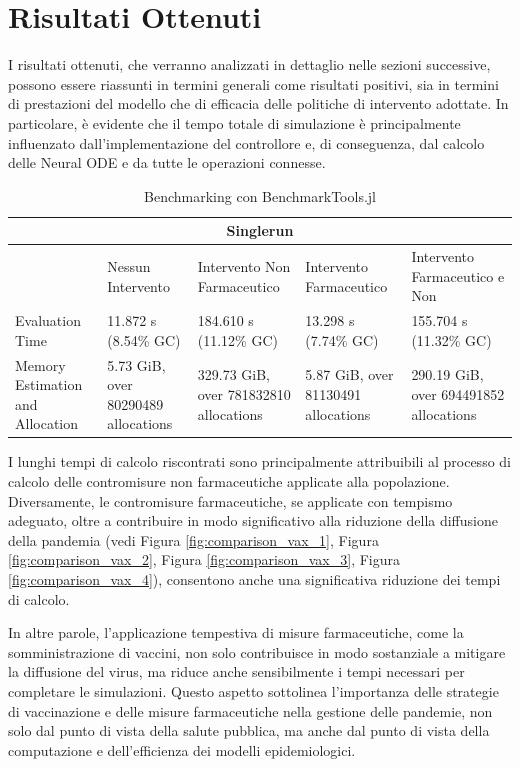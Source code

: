 \section{Risultati Ottenuti}

I risultati ottenuti, che verranno analizzati in dettaglio nelle 
sezioni successive, possono essere riassunti in termini generali come 
risultati positivi, sia in termini di prestazioni del modello che di 
efficacia delle politiche di intervento adottate. In particolare, 
è evidente che il tempo totale di simulazione è principalmente 
influenzato dall'implementazione del controllore e, di conseguenza, 
dal calcolo delle Neural ODE e da tutte le operazioni connesse.

\begin{table}[htb]
    \centering
    \caption{Benchmarking con BenchmarkTools.jl \cite{chen2016robust}}
    \begin{tabular}{|p{2.57cm}||p{2.57cm}|p{2.57cm}|p{2.57cm}|p{2.57cm}|}
        \hline
        \multicolumn{5}{|c|}{Singlerun} \\
        \hline
        & Nessun Intervento & Intervento Non Farmaceutico & Intervento Farmaceutico & Intervento Farmaceutico e Non \\
        \hline
        Evaluation Time & 11.872 s (8.54\% GC) & 184.610 s (11.12\% GC) & 13.298 s (7.74\% GC) & 155.704 s (11.32\% GC) \\
        Memory Estimation and Allocation & 5.73 GiB, over 80290489 allocations & 329.73 GiB, over 781832810 allocations & 5.87 GiB, over 81130491 allocations & 290.19 GiB, over 694491852 allocations \\
        \hline
    \end{tabular}
\end{table}

I lunghi tempi di calcolo riscontrati sono principalmente attribuibili 
al processo di calcolo delle contromisure non farmaceutiche applicate 
alla popolazione. Diversamente, le contromisure farmaceutiche, 
se applicate con tempismo adeguato, oltre a contribuire in modo 
significativo alla riduzione della diffusione della pandemia 
(vedi Figura \ref{fig:comparison_vax_1}, Figura 
\ref{fig:comparison_vax_2}, Figura \ref{fig:comparison_vax_3}, 
Figura \ref{fig:comparison_vax_4}), consentono anche una significativa 
riduzione dei tempi di calcolo.

In altre parole, l'applicazione tempestiva di misure farmaceutiche, 
come la somministrazione di vaccini, non solo contribuisce in modo 
sostanziale a mitigare la diffusione del virus, ma riduce anche 
sensibilmente i tempi necessari per completare le simulazioni. 
Questo aspetto sottolinea l'importanza delle strategie di vaccinazione 
e delle misure farmaceutiche nella gestione delle pandemie, 
non solo dal punto di vista della salute pubblica, ma anche dal punto 
di vista della computazione e dell'efficienza dei modelli epidemiologici.
\newpage

